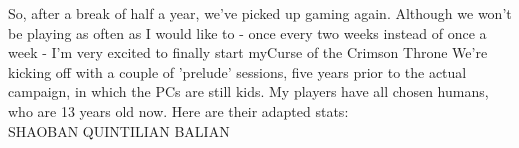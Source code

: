 So, after a break of half a year, we've picked up gaming again. Although we won't be playing as often as I would like to - once every two weeks instead of once a week - I'm very excited to finally start myCurse of the Crimson Throne We're kicking off with a couple of 'prelude' sessions, five years prior to the actual campaign, in which the PCs are still kids. My players have all chosen humans, who are 13 years old now. Here are their adapted stats:\\

SHAOBAN                 QUINTILIAN                BALIAN                 